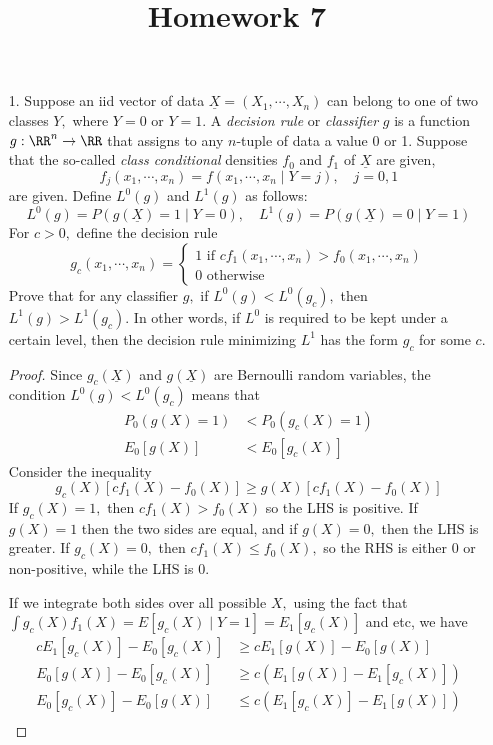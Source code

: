 \documentclass{article}
\begin{document}
\title{Homework 7}
\maketitle
\thispagestyle{fancy}

\begin{enumerate}
	\item[1.] Suppose an iid vector of data $\underline{X}=(X_1,\cdots, X_n)$ can belong to one of two classes $Y,$ where $Y=0$ or $Y=1.$ A \textit{decision rule} or \textit{classifier} $g$ is a function $g:\RR^n\to \RR$ that assigns to any $n$-tuple of data a value 0 or 1. Suppose that the so-called \textit{class conditional} densities $f_0$ and $f_1$ of $\underline{X}$ are given, \[f_j(x_1, \cdots, x_n)=f(x_1, \cdots, x_n\mid Y=j), \quad j=0, 1\] are given. Define $L^0(g)$ and $L^1(g)$ as follows: \[L^0(g) = P(g(\underline{X})=1\mid Y=0), \quad L^1(g) = P(g(\underline{X})=0\mid Y=1)\] For $c>0,$ define the decision rule \[g_c(x_1, \cdots, x_n)=\begin{cases}
				1 \text{ if } cf_1(x_1, \cdots, x_n)>f_0(x_1,\cdots, x_n) \\
				0\text{ otherwise}
		\end{cases} \] Prove that for any classifier $g,$ if $L^0(g)<L^0(g_c),$ then $L^1(g)>L^1(g_c).$ In other words, if $L^0$ is required to be kept under a certain level, then the decision rule minimizing $L^1$ has the form $g_c$ for some $c.$
		\begin{proof}
			Since $g_c(\underline{X})$ and $g(\underline{X})$ are Bernoulli random variables, the condition $L^0(g)<L^0(g_c)$ means that
			\begin{align*}
				P_0(g(X)=1) &< P_0(g_c(X)=1) \\
				\tag{1}E_0[g(X)] &< E_0[g_c(X)]
			\end{align*}
			Consider the inequality \[g_c(X)\left[ c f_1(X)-f_0(X) \right]\ge g(X)\left[ c f_1(X)-f_0(X) \right]\] If $g_c(X)=1,$ then $cf_1(X)>f_0(X)$ so the LHS is positive. If $g(X)=1$ then the two sides are equal, and if $g(X)=0,$ then the LHS is greater. If $g_c(X)=0,$ then $cf_1(X)\le f_0(X),$ so the RHS is either 0 or non-positive, while the LHS is 0. 

			If we integrate both sides over all possible $X,$ using the fact that $\int g_c(X) f_1(X) = E[g_c(X)\mid Y=1] = E_1[g_c(X)]$ and etc, we have
			\begin{align*}
				c E_1[g_c(X)] - E_0[g_c(X)] &\ge c E_1[g(X)] - E_0[g(X)] \\
				E_0[g(X)]-E_0[g_c(X)] &\ge c\left( E_1[g(X)]-E_1[g_c(X)] \right) \\
				E_0[g_c(X)]-E_0[g(X)] &\le c\left( E_1[g_c(X)]-E_1[g(X)] \right) \\
			\end{align*}


\end{proof}
\end{enumerate}
\end{document}

